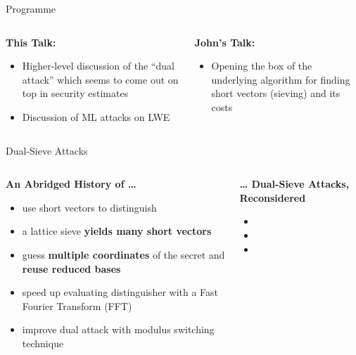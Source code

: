 \documentclass[xcolor=table,10pt,aspectratio=169]{beamer}
\begin{document}
\begin{frame}[label={sec:org592ac25}]{Programme}
\begin{columns}[t]
\begin{column}{0.45\columnwidth}
\textbf{This Talk:}

\begin{itemize}
\item Higher-level discussion of the ``dual attack'' which seems to come out on top in security estimates
\item Discussion of ML attacks on LWE
\end{itemize}
\end{column}

\begin{column}{0.55\columnwidth}
\textbf{John's Talk:}

\begin{itemize}
\item Opening the box of the underlying algorithm for finding short vectors (sieving) and its costs
\end{itemize}
\end{column}
\end{columns}
\end{frame}

\begin{frame}[label={sec:org564a4cc}]{Dual-Sieve Attacks}
\begin{columns}
\begin{column}[t]{0.47\columnwidth}
\textbf{An Abridged History of …}

\begin{itemize}
\item \cite{Aharonov:2005:LPN} use short vectors to distinguish
\item \cite{USENIX:ADPS16} a lattice sieve \textbf{yields many short vectors}
\item \cite{EC:Albrecht17} guess \textbf{multiple coordinates} of the secret and \textbf{reuse reduced bases}
\item \cite{AC:GuoJoh21} speed up evaluating distinguisher with a Fast Fourier Transform (FFT)
\item \cite{Matzov22} improve dual attack with modulus switching technique
\end{itemize}
\end{column}

\begin{column}[t]{0.53\columnwidth}
\textbf{… Dual-Sieve Attacks, Reconsidered}

\footnotesize

\begin{itemize}
\item {}
\item {}
\item {}
\end{itemize}

\par
\end{column}
\end{columns}
\end{frame}
\end{document}
